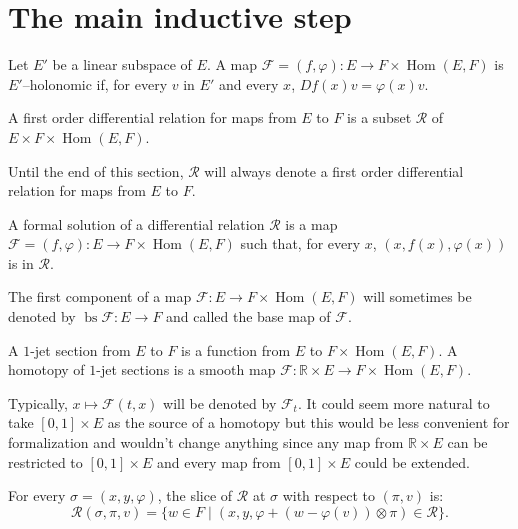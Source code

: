 \documentclass[10pt,a4paper]{article}
\newcommand{\co}{\!:}
\newcommand{\Rel}{\mathcal{R}} %
\DeclareMathOperator{\Hom}{Hom}
\newcommand{\F}{\mathcal{F}} %
\DeclareMathOperator{\bs}{bs} %
\newcommand{\uses}[1]{}
\newcommand{\lean}[1]{}
\newcommand{\leanok}{}
\begin{document}
\section{The main inductive step}
\label{sec:inductive_step}

\begin{definition}
  \label{def:hol_partial}
  \leanok
  \lean{JetSec.IsPartHolonomicAt}
  Let $E'$ be a linear subspace of $E$.
  A map $\F = (f, φ) : E → F × \Hom(E, F)$ is $E'$--holonomic if,
  for every $v$ in $E'$ and every $x$, $Df(x)v = φ(x)v$.
\end{definition}

\begin{definition}
  \label{def:rel_loc}
  \leanok
  \lean{RelLoc}
  A first order differential relation for maps from $E$ to $F$ is a
  subset $\Rel$ of $E × F × \Hom(E, F)$.
\end{definition}

Until the end of this section, $\Rel$ will always denote a first order
differential relation for maps from $E$ to $F$.

\begin{definition}
  \label{def:formal_sol_loc}
  \leanok
  \lean{RelLoc.FormalSol}
  \uses{def:rel_loc}
  A formal solution of a differential relation $\Rel$ is a map
  $\F = (f, φ) \co E → F × \Hom(E, F)$ such that, for every $x$,
  $(x, f(x), φ(x))$ is in $\Rel$.
\end{definition}

The first component of a map $\F \co E → F × \Hom(E, F)$ will sometimes
be denoted by $\bs \F \co E → F$ and called the base map of $\F$.

\begin{definition}
  \label{def:htpy_jet_sec_loc}
  \leanok
  \lean{HtpyJetSec}
  A $1$-jet section from $E$ to $F$ is a function from $E$ to $F × \Hom(E, F)$.
  A homotopy of $1$-jet sections is a smooth map
  $\F : ℝ × E → F × \Hom(E, F)$.
\end{definition}

Typically, $x ↦ \F(t, x)$ will be denoted by $\F_t$. It could seem more natural to take
$[0, 1] × E$ as the source of a homotopy but this would be less convenient for
formalization and wouldn't change anything since any map from $ℝ × E$ can be restricted to
$[0, 1] × E$ and every map from $[0, 1] × E$ could be extended.

\begin{definition}
  \label{def:rel_slice}
  \leanok
  \lean{RelMfld.slice}
  \uses{def:rel_loc}
  For every $σ = (x, y, φ)$, the slice of $\Rel$ at $σ$ with respect to $(π, v)$
  is:
  \[
    \Rel(σ, π, v) = \{w ∈ F \;|\; (x, y, φ + (w - φ(v)) ⊗ π) ∈ \Rel\}.
  \]
\end{definition}
\end{document}
